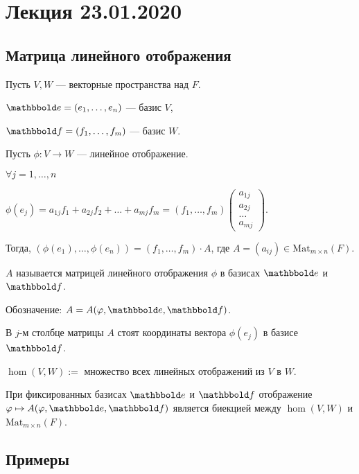 \section{Лекция 23.01.2020}

\subsection{Матрица линейного отображения}

Пусть $V, W$ --- векторные пространства над $F$.

$\E = (e_1, \dots, e_n)$ --- базис $V$,

$\F = (f_1, \dots, f_m)$ --- базис $W$.

\bigskip
Пусть $\phi: V \to W$ --- линейное отображение.

$\forall j = 1, \dots, n$

$\phi(e_j) = a_{1j} f_1 + a_{2j} f_2 + \dots + a_{mj} f_m = (f_1, \dots, f_m) \begin{pmatrix} a_{1j} \\ a_{2j} \\ \dots \\ a_{mj} \end{pmatrix}$.

Тогда, $(\phi(e_1), \dots, \phi(e_n)) = (f_1, \dots, f_m) \cdot A$, где $A = (a_{ij}) \in \text{Mat}_{m \times n} (F)$.

\begin{definition}
    $A$ называется матрицей линейного отображения $\phi$ в базисах $\E$ и $\F$.

    Обозначение: $A = A(\phi, \E, \F)$.
\end{definition}

В $j$-м столбце матрицы $A$ стоят координаты вектора $\phi(e_j)$ в базисе $\F$.

\begin{designation}
    $\hom(V, W) := $ множество всех линейных отображений из $V$ в $W$.
\end{designation}

\begin{corollary}
    При фиксированных базисах $\E$ и $\F$ отображение $\phi \mapsto A(\phi, \E, \F)$ является биекцией между $\hom(V, W)$ и $\text{Mat}_{m \times n}(F)$.
\end{corollary}


\subsection{Примеры}

